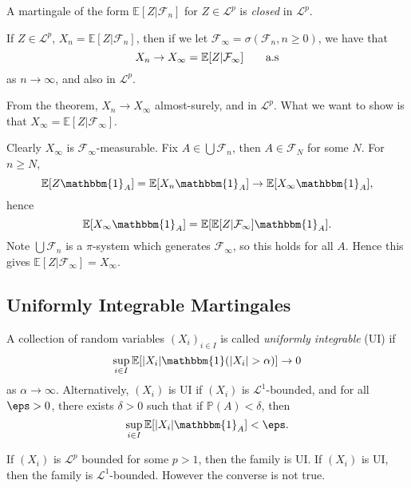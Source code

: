 \documentclass[12pt]{article}
\begin{document}
\begin{definition}
	A martingale of the form $\mathbb{E}[Z | \mathcal{F}_n]$ for $Z \in \mathcal{L}^p$ is \emph{closed} in $\mathcal{L}^p$.
\end{definition}

\begin{corollary}
	If $Z \in \mathcal{L}^p$, $X_n = \mathbb{E}[Z | \mathcal{F}_n]$, then if we let $\mathcal{F}_\infty = \sigma(\mathcal{F}_n, n \geq 0)$, we have that
	\[
		X_n \to X_\infty = \mathbb{E}[Z | \mathcal{F}_\infty] \qquad \text{\normalfont{a.s}}
	\]
	as $n \to \infty$, and also in $\mathcal{L}^p$.
\end{corollary}

\begin{proofbox}
	From the theorem, $X_n \to X_\infty$ almost-surely, and in $\mathcal{L}^p$. What we want to show is that $X_\infty = \mathbb{E}[Z | \mathcal{F}_\infty]$.

	Clearly $X_\infty$ is $\mathcal{F}_\infty$-measurable. Fix $A \in \bigcup \mathcal{F}_n$, then $A \in \mathcal{F}_N$ for some $N$. For $n \geq N$,
	\[
	\mathbb{E}[Z \mathbbm{1}_{A}] = \mathbb{E}[X_n \mathbbm{1}_{A}] \to \mathbb{E}[X_\infty \mathbbm{1}_{A}],
	\]
	hence
	\[
	\mathbb{E}[X_\infty \mathbbm{1}_{A}] = \mathbb{E}[\mathbb{E}[Z | \mathcal{F}_\infty] \mathbbm{1}_{A}].
	\]
	Note $\bigcup \mathcal{F}_n$ is a $\pi$-system which generates $\mathcal{F}_\infty$, so this holds for all $A$. Hence this gives $\mathbb{E}[Z|\mathcal{F}_\infty] = X_\infty$.
\end{proofbox}

\subsection{Uniformly Integrable Martingales}%
\label{sub:ui_mg}

\begin{definition}
	A collection of random variables $(X_i)_{i \in I}$ is called \emph{uniformly integrable} (UI) if
	\[
		\sup_{i \in I} \mathbb{E}[|X_i| \mathbbm{1}(|X_i| > \alpha)] \to 0
	\]
	as $\alpha \to \infty$. Alternatively, $(X_i)$ is UI if $(X_i)$ is $\mathcal{L}^1$-bounded, and for all $\eps > 0$, there exists $\delta > 0$ such that if $\mathbb{P}(A) < \delta$, then
	\[
	\sup_{i \in I} \mathbb{E}[|X_i| \mathbbm{1}_{A}] < \eps.
	\]
\end{definition}

If $(X_i)$ is $\mathcal{L}^p$ bounded for some $p > 1$, then the family is UI. If $(X_i)$ is UI, then the family is $\mathcal{L}^1$-bounded. However the converse is not true.
\end{document}
